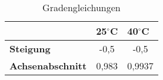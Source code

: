 \begin{table}[H]
  \centering
  \caption{Gradengleichungen}
    \begin{tabular}{lcc}
    \toprule
          & \multicolumn{1}{l}{\boldmath{}\textbf{25$^\circ$C}\unboldmath{}} & \multicolumn{1}{l}{\boldmath{}\textbf{40$^\circ$C}\unboldmath{}} \\
    \midrule
    \textbf{Steigung} & -0,5  & -0,5 \\
    \textbf{Achsenabschnitt} & 0,983 & 0,9937 \\
    \bottomrule
    \end{tabular}%
  \label{tab:addlabel}%
\end{table}%
